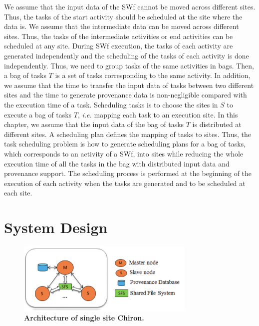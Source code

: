 We assume that the input data of the SWf cannot be moved across different sites. 
Thus, the tasks of the start activity should be scheduled at the site where the data is. 
We assume that the intermediate data can be moved across different sites. 
Thus, the tasks of the intermediate activities or end activities can be scheduled at any site. 
During SWf execution, the tasks of each activity are generated independently and the scheduling of the tasks of each activity is done independently. 
Thus, we need to group tasks of the same activities in bags. Then, a bag of tasks $T$ is a set of tasks corresponding to the same activity.
In addition, we assume that the time to transfer the input data of tasks between two different sites and the time to generate provenance data is non-negligible compared with the execution time of a task.
Scheduling tasks is to choose the sites in $S$ to execute a bag of tasks $T$, \textit{i.e.} mapping each task to an execution site. 
In this chapter, we assume that the input data of the bag of tasks $T$ is distributed at different sites. A scheduling plan defines the mapping of tasks to sites.
Thus, the task scheduling problem is how to generate scheduling plans for a bag of tasks, which corresponds to an activity of a SWf, into sites while reducing the whole execution time of all the tasks in the bag with distributed input data and provenance support. The scheduling process is performed at the beginning of the execution of each activity when the tasks are generated and to be scheduled at each site.


\section{System Design}
\label{sec:FGSA}

\begin{figure}
\begin{centering}
\captionsetup{justification=centering}
\includegraphics[width=85mm]{figures/EASSC}
\par\end{centering}
\caption{\textbf{Architecture of single site Chiron. }}
\label{fig:EASSC}
\end{figure}

